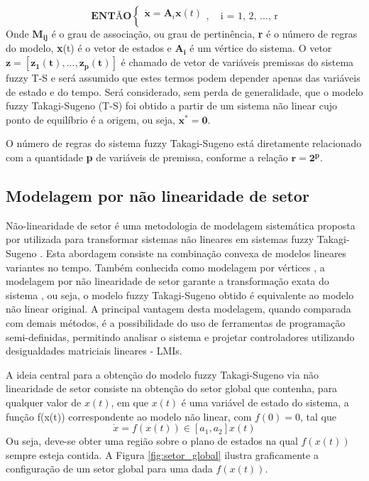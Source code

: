 \begin{equation}\label{eq:fuzzy_TS_regras}
\textbf{ENT\~{A}O}  \begin{cases} \mathbf{\dot{x} = A}_i \mathbf{x}(t)\\\end{cases}, \quad \textrm{i = 1, 2, ..., r}
\end{equation}
Onde $\mathbf{M_{ij}}$ é o grau de associação, ou grau de pertinência, \textbf{r} é o número de regras do modelo, \textbf{x}(t) é o vetor de estados e $\mathbf{A_i}$ é um vértice do sistema. O vetor $\mathbf{z = [z_1(t), ..., z_p(t)]}$ é chamado de vetor de variáveis premissas do sistema fuzzy T-S e será assumido que  estes termos podem depender apenas das variáveis de estado e do tempo. Será considerado, sem perda de generalidade, que o modelo fuzzy Takagi-Sugeno (T-S) foi obtido a partir de um sistema não linear cujo ponto de equilíbrio é a origem, ou seja, $\textbf{x}^* = \textbf{0}$.

O número de regras do sistema fuzzy Takagi-Sugeno está diretamente relacionado com a quantidade \textbf{p} de variáveis de premissa, conforme a relação $\mathbf{r = 2^p}$.

\subsection{Modelagem por não linearidade de setor}\label{subsec:sector_nonlinearuty_modeling}

Não-linearidade de setor é uma metodologia de modelagem sistemática proposta por \cite{booktw:2003} utilizada para transformar sistemas não lineares em sistemas fuzzy Takagi-Sugeno \cite{articlets:1985}. Esta abordagem consiste na combinação convexa de modelos lineares variantes no tempo. Também conhecida como modelagem por vértices \cite{articlets:2009}, a modelagem por não linearidade de setor garante a transformação exata do sistema \cite{booktw:2003}, ou seja, o modelo fuzzy Takagi-Sugeno obtido é equivalente ao modelo não linear original. A principal vantagem desta modelagem, quando comparada com demais métodos, é a possibilidade do uso de ferramentas de programação semi-definidas, permitindo analisar o sistema e projetar controladores utilizando desigualdades matriciais lineares - LMIs.

A ideia central para a obtenção do modelo fuzzy Takagi-Sugeno via não linearidade de setor consiste na obtenção do setor global que contenha, para qualquer valor de $x(t)$, em que $x(t)$ é uma variável de estado do sistema, a função f(x(t)) correspondente ao modelo não linear, com $f(0) = 0$, tal que
\begin{equation}\label{eq:setor_global}
\dot{x} = f(x(t)) \in [a_1, a_2] x(t)
\end{equation}
Ou seja, deve-se obter uma região sobre o plano de estados na qual $f(x(t))$ sempre esteja contida. A Figura \ref{fig:setor_global} ilustra graficamente a configuração de um setor global para uma dada $f(x(t))$.

